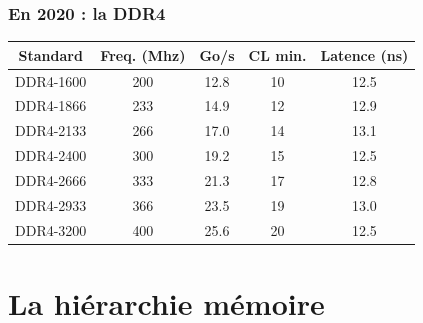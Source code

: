 \documentclass[xcolor={x11names,svgnames}, 14pt]{beamer}
\begin{document}
\begin{frame}
  \frametitle{En 2020 : la DDR4}

   
  \bigskip
  
  \small
  \begin{tabular}{|c|c|c|c|c|}
  \hline
Standard   & Freq. (Mhz) & Go/s  & CL min. & Latence (ns) \\
  \hline\hline                                                                    
DDR4-1600  & 200         & 12.8 & 10      & 12.5   \\
DDR4-1866  & 233         & 14.9 & 12      & 12.9 \\
DDR4-2133  & 266         & 17.0 & 14      & 13.1 \\
DDR4-2400  & 300         & 19.2 & 15      & 12.5   \\
DDR4-2666  & 333         & 21.3 & 17      & 12.8  \\
DDR4-2933  & 366         & 23.5 & 19      & 13.0  \\
DDR4-3200  & 400         & 25.6 & 20      & 12.5   \\
  \hline                                                                                            
\end{tabular}
\end{frame}


\section{La hiérarchie mémoire}

\end{document}
